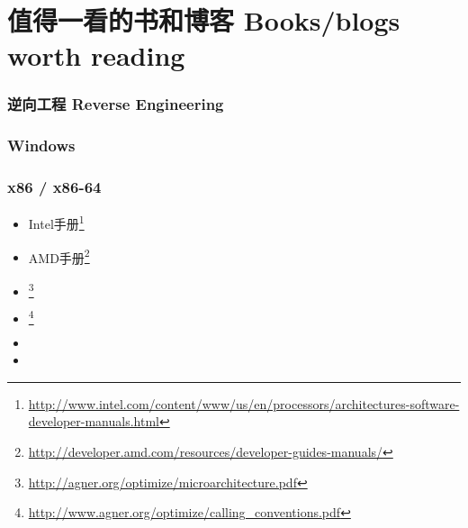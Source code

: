 \documentclass[UTF8,nofonts]{ctexart}
\begin{document}

\chapter{值得一看的书和博客 Books/blogs worth reading}


\subsection{逆向工程 Reverse Engineering}




\subsection{Windows}



\subsection{\CCpp}



\subsection{x86 / x86-64}

\label{x86_manuals}
\begin{itemize}
\item Intel手册\footnote{\AlsoAvailableAs \url{http://www.intel.com/content/www/us/en/processors/architectures-software-developer-manuals.html}}

\item AMD手册\footnote{\AlsoAvailableAs \url{http://developer.amd.com/resources/developer-guides-manuals/}}

\item \AgnerFog{}\footnote{\AlsoAvailableAs \url{http://agner.org/optimize/microarchitecture.pdf}}

\item \AgnerFogCC{}\footnote{\AlsoAvailableAs \url{http://www.agner.org/optimize/calling_conventions.pdf}}

\item \IntelOptimization

\item \AMDOptimization
\end{itemize}
\end{document}
